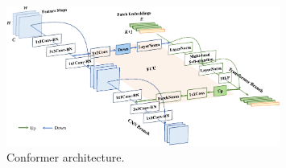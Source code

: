 \begin{figure}[t]
    \centering
    \includegraphics[width=0.8\textwidth]{fig/rel/images/conformer.pdf}
    \caption{Conformer architecture.}
    \label{fig:rel_conformer}
\end{figure}